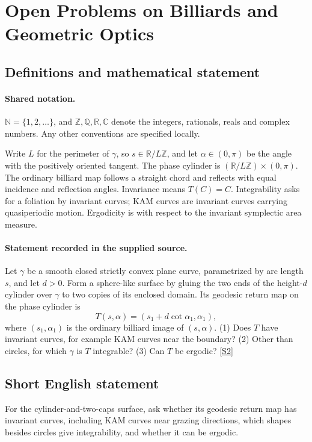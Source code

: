 \documentclass[11pt]{article}
\newcommand{\sref}[2]{\hyperlink{source:#1:#2}{[S#2]}}
\begin{document}
\section{Open Problems on Billiards and Geometric Optics}\label{statement}

\subsection{Definitions and mathematical statement}

\paragraph{Shared notation.}$\mathbb N=\{1,2,\ldots\}$, and $\mathbb Z,\mathbb Q,\mathbb R,\mathbb C$ denote the integers, rationals, reals and complex numbers. Any other conventions are specified locally.


Write $L$ for the perimeter of $\gamma$, so $s\in\mathbb R/L\mathbb Z$, and let $\alpha\in(0,\pi)$ be the angle with the positively oriented tangent. The phase cylinder is $(\mathbb R/L\mathbb Z)\times(0,\pi)$. The ordinary billiard map follows a straight chord and reflects with equal incidence and reflection angles. Invariance means $T(C)=C$. Integrability asks for a foliation by invariant curves; KAM curves are invariant curves carrying quasiperiodic motion. Ergodicity is with respect to the invariant symplectic area measure.
\paragraph{Statement recorded in the supplied source.}
Let $\gamma$ be a smooth closed strictly convex plane curve, parametrized by arc length $s$, and let $d>0$. Form a sphere-like surface by gluing the two ends of the height-$d$ cylinder over $\gamma$ to two copies of its enclosed domain. Its geodesic return map on the phase cylinder is $$T(s,\alpha)=(s_1+d\cot\alpha_1,\alpha_1),$$ where $(s_1,\alpha_1)$ is the ordinary billiard image of $(s,\alpha)$. (1) Does $T$ have invariant curves, for example KAM curves near the boundary? (2) Other than circles, for which $\gamma$ is $T$ integrable? (3) Can $T$ be ergodic? \sref{statement}{2}
\subsection{Short English statement}
For the cylinder-and-two-caps surface, ask whether its geodesic return map has invariant curves, including KAM curves near grazing directions, which shapes besides circles give integrability, and whether it can be ergodic.
\end{document}
